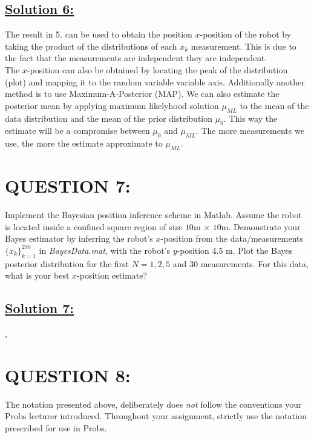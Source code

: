 \documentclass[a4paper,11pt]{article}
\begin{document}
\subsection*{\underline{Solution 6:}}
The result in 5. can be used to obtain the position $x$-position of the robot by taking the product of the distributions of each $x_k$ measurement. This is due to the fact that the measurements are independent they are independent.\\
The $x$-position can also be obtained by locating the peak of the distribution (plot) and mapping it to the random variable variable axis. Additionally another method is to use Maximum-A-Posterior (MAP). We can also estimate the posterior mean by applying maximum likelyhood solution $\mu_{ML}$ to the mean of the data distribution and the mean of the prior distribution $\mu_0$. This way the estimate will be a compromise between $\mu_0$ and $\mu_{ML}$. The more measurements we use, the more the estimate approximate to $\mu_{ML}$.

\section{QUESTION 7:}
Implement the Bayesian position inference scheme in Matlab. Assume the robot is
located inside a confined square region of size $10$m $\times$ $10$m. Demonstrate your Bayes
estimator by inferring the robot’s $x$-position from the data/measurements $\{ x_k \}^{200} _{k = 1}$ in \emph{BayesData.mat}, with the robot’s $y$-position 4.5 m. Plot the Bayes posterior distribution for the first $N = 1, 2, 5$ and $30$ measurements. For this data, what is your best $x$-position estimate?

\subsection*{\underline{Solution 7:}}
,

\section{QUESTION 8:}
The notation presented above, deliberately does \emph{not} follow the conventions your Probs
lecturer introduced. Throughout your assignment, strictly use the notation prescribed for
use in Probs.
\end{document}
